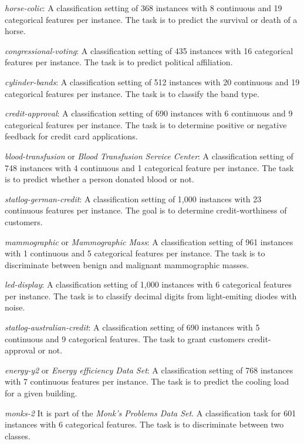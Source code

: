 \documentclass{article}
\theoremstyle{plain}
\theoremstyle{definition}
\theoremstyle{remark}
\begin{document}
\begin{description}[topsep=-1.5pt,itemsep=1.5pt]
    \item {\em horse-colic}: A classification setting of 368 instances with 8 continuous and 19 categorical features per instance. The task is to predict the survival or death of a horse.
    
    \item {\em congressional-voting}: A classification setting of 435 instances with 16 categorical features per instance. The task is to predict political affiliation.
    
    \item {\em cylinder-bands}: A classification setting of 512 instances with 20 continuous and 19 categorical features per instance. The task is to classify the band type.
    
    \item {\em credit-approval}: A classification setting of 690 instances with 6 continuous and 9 categorical features per instance. The task is to determine positive or negative feedback for credit card applications.
    
    \item {\em blood-transfusion} or {\em Blood Transfusion Service Center}: A classification setting of 748 instances with 4 continuous and 1 categorical feature per instance. The task is to predict whether a person donated blood or not.
    
    \item{\em statlog-german-credit}: A classification setting of 1,000 instances with 23
    continuous features per instance. The goal is to determine credit-worthiness of customers.
    
    \item {\em mammographic} or {\em Mammographic Mass}: A classification setting of 961 instances with 1 continuous and 5 categorical features per instance. The task is to discriminate between benign and malignant mammographic masses.
    
    \item{\em led-display}: A classification setting of 1,000 instances with 6 categorical features
    per instance. The task is to classify decimal digits from light-emiting diodes with noise.
    
    \item {\em statlog-australian-credit}: A classification setting of 690 instances
    with 5 continuous and 9 categorical features. The task to grant customers
    credit-approval or not.
    
    \item {\em energy-y2} or {\em Energy efficiency Data Set}:
    A classification setting of 768 instances with 7 continuous
    features per instance. The task is to predict the cooling load for a given building.
    
    \item {\em monks-2} It is part of the {\em Monk's Problems Data Set}. A classification
    task for 601 instances with 6 categorical features. The task is to discriminate
    between two classes.
\end{description}
\end{document}
